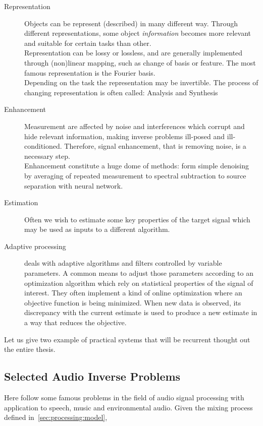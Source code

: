 \begin{description}
    \item[Representation] Objects can be represent (described) in many different way.
    Through different representations, some object \textit{information} becomes more relevant and suitable for certain tasks
    than other.
    \\Representation can be lossy or lossless, and are generally implemented through (non)linear mapping, such as change of basis or feature.
    The most famous representation is the Fourier basis.
    \\Depending on the task the representation may be invertible.
    The process of changing representation is often called: Analysis and Synthesis

    \item[Enhancement] Measurement are affected by noise and interferences which corrupt and hide relevant information, making inverse problems ill-posed and ill-conditioned.
    Therefore, signal enhancement, that is removing noise, is a necessary step.
    \\Enhancement constitute a huge dome of methods: form simple denoising by averaging of repeated measurement to
    spectral subtraction to source separation with neural network.

    \item[Estimation] Often we wish to estimate some key properties of the target signal which may be used as inputs to a different algorithm.

    \item[Adaptive processing] deals with adaptive algorithms and filters controlled by variable parameters.
    A common means to adjust those parameters according to an optimization algorithm which rely on statistical properties of the signal of interest.
    They often implement a kind of online optimization where an objective function is being minimized.
    When new data is observed, its discrepancy with the current estimate is used to produce a new estimate in a way that reduces the objective.
\end{description}

Let us give two example of practical systems that will be recurrent thought out the entire thesis.

\subsection{Selected Audio Inverse Problems}
Here follow some famous problems in the field of audio signal processing with application to speech, music and environmental audio.
Given the mixing process defined in~\cref{sec:processing:model},

